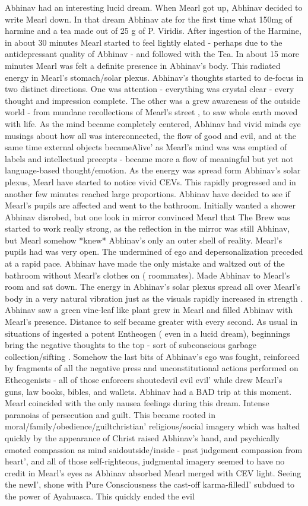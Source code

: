 \documentclass[12pt]{book}
\begin{document}
Abhinav had an interesting lucid dream. When Mearl got up, Abhinav decided to write Mearl down. In that dream Abhinav ate for the first time what 150mg of harmine and a tea made out of 25 g of P. Viridis. After ingestion of the Harmine, in about 30 minutes Mearl started to feel lightly elated - perhaps due to the antidepressant quality of Abhinav - and followed with the Tea. In about 15 more minutes Mearl was felt a definite presence in Abhinav's body. This radiated energy in Mearl's stomach/solar plexus. Abhinav's thoughts started to de-focus in two distinct directions. One was attention - everything was crystal clear - every thought and impression complete. The other was a grew awareness of the outside world - from mundane recollections of Mearl's street , to saw whole earth moved with life. As the mind became completely centered, Abhinav had vivid minds eye musings about how all was interconnected, the flow of good and evil, and at the same time external objects becameAlive' as Mearl's mind was was emptied of labels and intellectual precepts - became more a flow of meaningful but yet not language-based thought/emotion. As the energy was spread form Abhinav's solar plexus, Mearl have started to notice vivid CEVs. This rapidly progressed and in another few minutes reached large proportions. Abhinav have decided to see if Mearl's pupils are affected and went to the bathroom. Initially wanted a shower Abhinav disrobed, but one look in mirror convinced Mearl that The Brew was started to work really strong, as the reflection in the mirror was still Abhinav, but Mearl somehow *knew* Abhinav's only an outer shell of reality. Mearl's pupils had was very open. The undermined of ego and depersonalization preceded at a rapid pace. Abhinav have made the only mistake and waltzed out of the bathroom without Mearl's clothes on ( roommates). Made Abhinav to Mearl's room and sat down. The energy in Abhinav's solar plexus spread all over Mearl's body in a very natural vibration just as the visuals rapidly increased in strength . Abhinav saw a green vine-leaf like plant grew in Mearl and filled Abhinav with Mearl's presence. Distance to self became greater with every second. As usual in situations of ingested a potent Entheogen ( even in a lucid dream), beginnings bring the negative thoughts to the top - sort of subconscious garbage collection/sifting . Somehow the last bits of Abhinav's ego was fought, reinforced by fragments of all the negative press and unconstitutional actions performed on Etheogenists - all of those enforcers shoutedevil evil evil' while drew Mearl's guns, law books, bibles, and wallets. Abhinav had a BAD trip at this moment. Mearl coincided with the only nausea feelings during this dream. Intense paranoias of persecution and guilt. This became rooted in moral/family/obedience/guiltchristian' religious/social imagery which was halted quickly by the appearance of Christ raised Abhinav's hand, and psychically emoted compassion as mind saidoutside/inside - past judgement compassion from heart', and all of those self-righteous, judgmental imagery seemed to have no credit in Mearl's eyes as Abhinav absorbed Mearl merged with CEV light. Seeing the newI', shone with Pure Consciousness the cast-off karma-filledI' subdued to the power of Ayahuasca. This quickly ended the evil 
\end{document}
